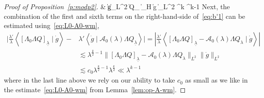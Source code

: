 \documentclass[10pt,reqno]{amsart}
\newcommand{\A}{\mathcal{A}}
\newcommand{\la}{\lambda}
\newcommand{\La}{\Lambda}
\newcommand{\ang}[1]{\left\langle{#1}\right\rangle}
\newcommand{\abs}[1]{\left\lvert{#1}\right\rvert}
\newcommand{\EQ}[1]{\begin{equation}\begin{split} #1 \end{split}\end{equation}}
\numberwithin{equation}{section}
\theoremstyle{remark}
\newcommand{\ula}{\underline{\lambda}}
\newcommand{\0}{\emptyset}
\begin{document}
\begin{proof}[Proof of Proposition~\ref{p:modp2}]
{& \lesssim \abs{ \mu'} \|  \dot g\|_{L^2}  \| \La Q_{\mu} \|_{H} \lesssim  \abs{ \mu'} \| \dot g \|_{L^2} \lesssim  \la^{k} \ll \la^{k-1}
}
Next, the combination of the first and sixth terms on the right-hand-side of~\eqref{eq:b'1} can be estimated using~\eqref{eq:L0-A0-wm}, 
\EQ{ \label{eq:A0cancel}
\Big|\frac{\la'}{\la}  \ang{[ \La_0 \La Q]_{\ula} \mid \dot g } - & \la' \ang{ \dot g \mid \A_0(\la) \La Q_{\ula}}\Big| = \abs{\frac{\la'}{\la} \ang{[ \La_0 \La Q]_{\ula} -  \A_0(\la) \La Q_{\la} \mid  \dot g} } \\
& \lesssim  \la^{\frac{k}{2}-1} \| [\La_0 \La Q]_{\ula} -  \A_0(\la) \La Q_{\la} \|_{L^2} \| \dot g \|_{L^2}  \\
& \lesssim c_0\la^{\frac{k}{2}-1}  \la^{\frac{k}{2}}   \ll \la^{k-1}
 }
 where in the last line above we rely on our ability to take $c_0$ as small as we like in the estimate~\eqref{eq:L0-A0-wm} from Lemma~\ref{lem:op-A-wm}. 
 

\end{proof}
\end{document}

